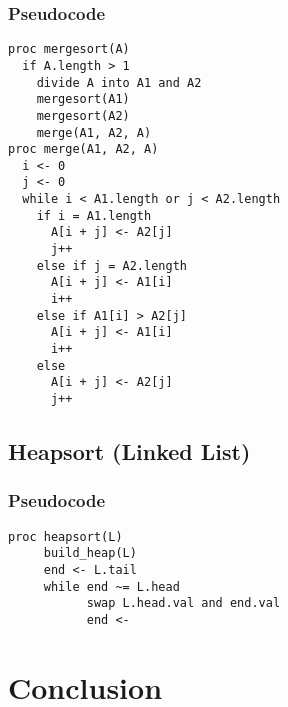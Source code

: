 \documentclass[a4paper,12pt]{article}
\begin{document}
\subsubsection{Pseudocode}
\begin{verbatim}
proc mergesort(A)
  if A.length > 1
    divide A into A1 and A2
    mergesort(A1)
    mergesort(A2)
    merge(A1, A2, A)
proc merge(A1, A2, A)
  i <- 0
  j <- 0
  while i < A1.length or j < A2.length
    if i = A1.length
      A[i + j] <- A2[j]
      j++
    else if j = A2.length
      A[i + j] <- A1[i]
      i++
    else if A1[i] > A2[j]
      A[i + j] <- A1[i]
      i++
    else 
      A[i + j] <- A2[j]
      j++     
\end{verbatim}
\subsection{Heapsort (Linked List)}
\subsubsection{Pseudocode}
\begin{verbatim}
proc heapsort(L)
     build_heap(L)
     end <- L.tail
     while end ~= L.head
           swap L.head.val and end.val
           end <- 
\end{verbatim}
\section{Conclusion}
\end{document}
